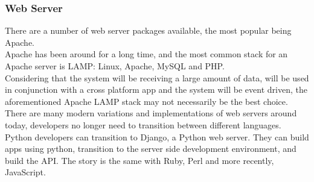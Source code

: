 \documentclass[draft,preprint,12pt,3p]{elsarticle}
\begin{document}
\subsubsection{Web Server}
There are a number of web server packages available, the most popular being Apache.\\
Apache has been around for a long time, and the most common stack for an Apache server is LAMP: Linux, Apache, MySQL and PHP.\\
Considering that the system will be receiving a large amount of data, will be used in conjunction with a cross platform app and the system will be event driven, the aforementioned Apache LAMP stack may not necessarily be the best choice.\\
There are many modern variations and implementations of web servers around today, developers no longer need to transition between different languages. Python developers can transition to Django, a Python web server. They can build apps using python, transition to the server side development environment, and build the API. The story is the same with Ruby, Perl and more recently, JavaScript.\\
\end{document}
